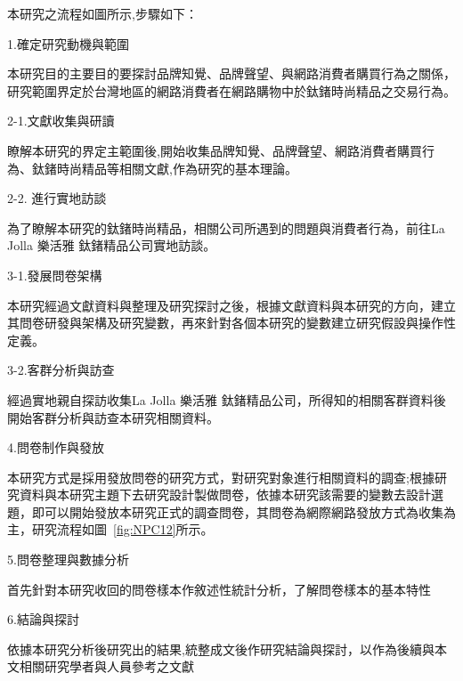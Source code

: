  本研究之流程如圖所示,步驟如下：

1.確定研究動機與範圍

         本研究目的主要目的要探討品牌知覺、品牌聲望、與網路消費者購買行為之關係，研究範圍界定於台灣地區的網路消費者在網路購物中於鈦鍺時尚精品之交易行為。

2-1.文獻收集與研讀

        瞭解本研究的界定主範圍後,開始收集品牌知覺、品牌聲望、網路消費者購買行為、鈦鍺時尚精品等相關文獻,作為研究的基本理論。

2-2. 進行實地訪談

        為了瞭解本研究的鈦鍺時尚精品，相關公司所遇到的問題與消費者行為，前往La Jolla 樂活雅 鈦鍺精品公司實地訪談。

3-1.發展問卷架構

       本研究經過文獻資料與整理及研究探討之後，根據文獻資料與本研究的方向，建立其問卷研發與架構及研究變數，再來針對各個本研究的變數建立研究假設與操作性定義。

3-2.客群分析與訪查

      經過實地親自探訪收集La Jolla 樂活雅 鈦鍺精品公司，所得知的相關客群資料後開始客群分析與訪查本研究相關資料。

4.問卷制作與發放

      本研究方式是採用發放問卷的研究方式，對研究對象進行相關資料的調查;根據研究資料與本研究主題下去研究設計製做問卷，依據本研究該需要的變數去設計選題，即可以開始發放本研究正式的調查問卷，其問卷為網際網路發放方式為收集為主，研究流程如圖~\ref{fig:NPC12}所示。

5.問卷整理與數據分析

      首先針對本研究收回的問卷樣本作敘述性統計分析，了解問卷樣本的基本特性

6.結論與探討

     依據本研究分析後研究出的結果,統整成文後作研究結論與探討，以作為後續與本文相關研究學者與人員參考之文獻

